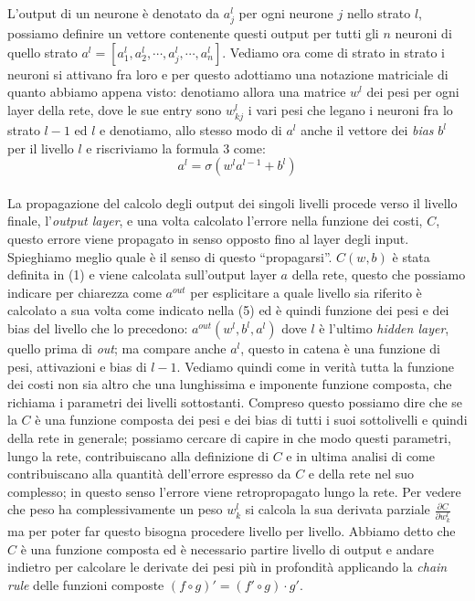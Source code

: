 L'output di un neurone è denotato da $ a^{l}_{j} $ per ogni neurone $j$ nello strato $l$, possiamo definire un vettore contenente questi output per tutti gli $n$ neuroni di quello strato $a^{l} = \left[a^{l}_{1},a^{l}_{2}, \cdots, a^{l}_{j}, \cdots, a^{l}_{n}  \right] $. Vediamo ora come di strato in strato i neuroni si attivano fra loro e per questo adottiamo una notazione matriciale di quanto abbiamo appena visto: denotiamo allora una matrice $w^{l}$ dei pesi per ogni layer della rete, dove le sue entry sono $w^{l}_{kj}$ i vari pesi che legano i neuroni fra lo strato $l-1$ ed $l$ e denotiamo, allo stesso modo di $a^{l}$ anche il vettore dei \textit{bias} $b^{l}$ per il livello $l$ e riscriviamo la formula 3 come:
\begin{equation}
	a^{l}=\sigma\left( w^{l}a^{l-1}+b^{l}\right)
\end{equation}
\\
La propagazione del calcolo degli output dei singoli livelli procede verso il livello finale, l'\textit{output layer}, e una volta calcolato l'errore nella funzione dei costi, $C$, questo errore viene propagato in senso opposto fino al layer degli input. Spieghiamo meglio quale è il senso di questo ``propagarsi''. 
$C(w,b)$ è stata definita in (1) e viene calcolata sull'output layer $a$ della rete, questo che possiamo indicare per chiarezza come $a^{out}$ per esplicitare a quale livello sia riferito è calcolato a sua volta come indicato nella (5) ed   è quindi funzione dei pesi e dei bias del livello che lo precedono: $ a^{out}(w^{l},b^{l}, a^{l})$ dove $l$ è l'ultimo \textit{hidden layer}, quello prima di \textit{out}; ma compare anche $a^{l}$, questo in catena è una funzione di pesi, attivazioni e bias di $l-1$. Vediamo quindi come in verità tutta la funzione dei costi non sia altro che una lunghissima e imponente funzione composta, che richiama i parametri dei livelli sottostanti. Compreso questo possiamo dire che se la $C$ è una funzione composta dei pesi e dei bias di tutti i suoi sottolivelli e quindi della rete in generale; possiamo cercare di capire in che modo questi parametri, lungo la rete, contribuiscano alla definizione di $C$ e in ultima analisi di come contribuiscano alla quantità dell'errore espresso da $C$ e della rete nel suo complesso; in questo senso l'errore viene retropropagato lungo la rete. Per vedere che peso ha complessivamente un peso $w_{k}^{l}$ si calcola la sua derivata parziale $\frac{\partial C}{\partial w_{k}^{l}}$ ma per poter far questo bisogna procedere livello per livello. Abbiamo detto che $C$ è una funzione composta ed è necessario partire livello di output e andare indietro per calcolare le derivate dei pesi più in profondità applicando la \textit{chain rule} delle funzioni composte $(f \circ g)'=(f' \circ g) \cdot g' $.
